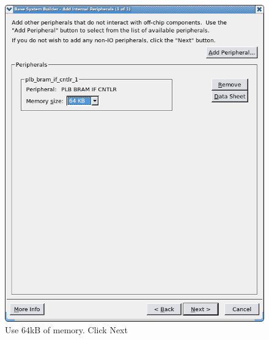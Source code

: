 \documentclass[a4paper,oneside]{memoir}
\begin{document}
\begin{figure}[H]
\centering
\includegraphics[scale=0.4]{BSB8}
\caption{Use 64kB of memory. Click Next\label{fig:BSB8}}
\end{figure}
\end{document}
